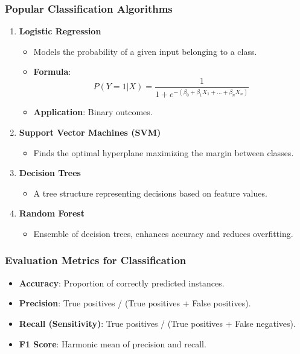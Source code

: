 \documentclass[aspectratio=169]{beamer}
\begin{document}
\begin{frame}[fragile]
    \frametitle{Popular Classification Algorithms}
    \begin{enumerate}
        \item \textbf{Logistic Regression}
            \begin{itemize}
                \item Models the probability of a given input belonging to a class.
                \item \textbf{Formula}:
                \begin{equation}
                    P(Y=1|X) = \frac{1}{1 + e^{-(\beta_0 + \beta_1X_1 + \ldots + \beta_nX_n)}}
                \end{equation}
                \item \textbf{Application}: Binary outcomes.
            \end{itemize}
        
        \item \textbf{Support Vector Machines (SVM)}
            \begin{itemize}
                \item Finds the optimal hyperplane maximizing the margin between classes.
            \end{itemize}
        
        \item \textbf{Decision Trees}
            \begin{itemize}
                \item A tree structure representing decisions based on feature values.
            \end{itemize}
        
        \item \textbf{Random Forest}
            \begin{itemize}
                \item Ensemble of decision trees, enhances accuracy and reduces overfitting.
            \end{itemize}
    \end{enumerate}
\end{frame}

\begin{frame}[fragile]
    \frametitle{Evaluation Metrics for Classification}
    \begin{itemize}
        \item \textbf{Accuracy}: Proportion of correctly predicted instances.
        \item \textbf{Precision}: True positives / (True positives + False positives).
        \item \textbf{Recall (Sensitivity)}: True positives / (True positives + False negatives).
        \item \textbf{F1 Score}: Harmonic mean of precision and recall.
    \end{itemize}
\end{frame}
\end{document}
